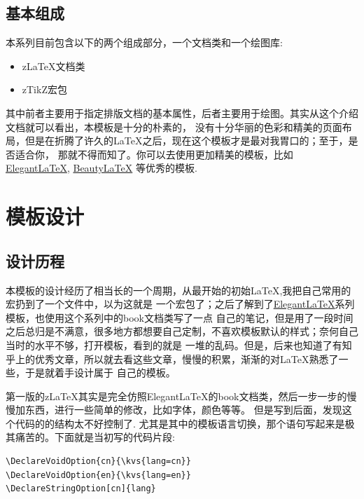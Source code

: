 \subsection{基本组成}
本系列目前包含以下的两个组成部分，一个文档类和一个绘图库:
\begin{itemize}
    \item z\LaTeX{}文档类
    \item zTikZ宏包
\end{itemize}

其中前者主要用于指定排版文档的基本属性，后者主要用于绘图。其实从这个介绍文档就可以看出，本模板是十分的朴素的，
没有十分华丽的色彩和精美的页面布局，但是在折腾了许久的\LaTeX{}之后，现在这个模板才是最对我胃口的；至于，是否适合你，
那就不得而知了。你可以去使用更加精美的模板，比如 \href{https://github.com/ElegantLaTeX}{Elegant\LaTeX{}}, 
\href{https://github.com/BeautyLaTeX/Beautybook}{Beauty\LaTeX{}} 等优秀的模板. 

\section{模板设计}
\subsection{设计历程}
本模板的设计经历了相当长的一个周期，从最开始的初始\LaTeX{},我把自己常用的宏扔到了一个文件中，以为这就是
一个宏包了；之后了解到了\href{https://github.com/ElegantLaTeX}{Elegant\LaTeX{}}系列模板，也使用这个系列中的book文档类写了一点
自己的笔记，但是用了一段时间之后总归是不满意，很多地方都想要自己定制，不喜欢模板默认的样式；奈何自己当时的水平不够，打开模板，看到的就是
一堆的乱码。但是，后来也知道了有知乎上的优秀文章，所以就去看这些文章，慢慢的积累，渐渐的对\LaTeX{}熟悉了一些，于是就着手设计属于
自己的模板。

第一版的z\LaTeX{}其实是完全仿照Elegant\LaTeX{}的book文档类，然后一步一步的慢慢加东西，进行一些简单的修改，比如字体，颜色等等。
但是写到后面，发现这个代码的的结构太不好控制了.
尤其是其中的模板语言切换，那个\cmd{\ifdefstring}语句写起来是极其痛苦的。下面就是当初写的代码片段:

\begin{verbatim}
\DeclareVoidOption{cn}{\kvs{lang=cn}}
\DeclareVoidOption{en}{\kvs{lang=en}}
\DeclareStringOption[cn]{lang}
\end{verbatim}

